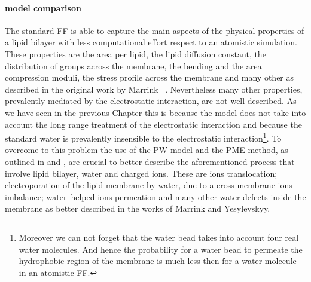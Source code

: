 \paragraph{\textbf{model comparison}} The standard \martini \ac{FF} is able to capture the main aspects of the physical properties of a lipid bilayer with less computational effort respect to an atomistic simulation. These properties are the area per lipid, the lipid diffusion constant, the distribution of groups across the membrane, the bending and the area compression moduli, the stress profile across the membrane and many other as described in the original work by Marrink \etal\, \cite{Martini}. Nevertheless many other properties, prevalently mediated by the electrostatic interaction, are not well described. As we have seen in the previous Chapter this is because the \martini model does not take into account the long range treatment of the electrostatic interaction and because the standard \martini water is prevalently insensible to the electrostatic interaction\footnote{Moreover we can not forget that the \martini water bead takes into account four real water molecules. And hence the probability for a \martini water bead to permeate the hydrophobic region of the membrane is much less then for a water molecule in an atomistic \ac{FF}.}. To overcome to this problem the use of the \ac{PW} model and the \ac{PME} method, as outlined in \cite{MartiniReview} and \cite{PW}, are crucial to better describe the aforementioned process that involve lipid bilayer, water and charged ions. These are ions translocation; electroporation of the lipid membrane by water, due to a cross membrane ions imbalance; water--helped ions permeation and many other water defects inside the membrane as better described in the works of Marrink and Yesylevskyy.


